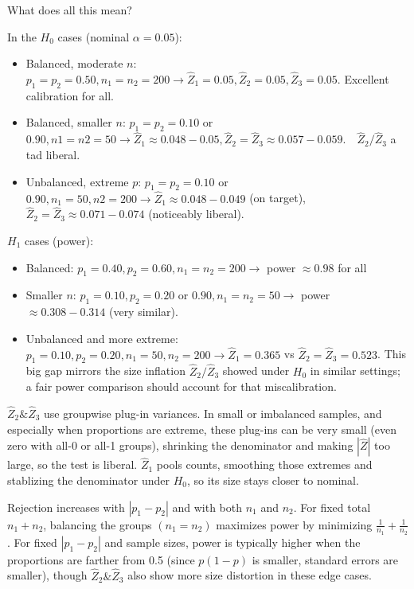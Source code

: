 \documentclass[10pt]{article}
\begin{document}
\begin{enumerate}[label=(\roman*)]
    What does all this mean?

    In the $H_0 $ cases (nominal $\alpha = 0.05 $):
    \begin{itemize}
        \item Balanced, moderate $n$: $p_1 = p_2 = 0.50, n_1 = n_2 = 200 \to \hat{Z}_1 = 0.05, \hat{Z}_2 = 0.05, \hat{Z}_3 = 0.05$. Excellent calibration for all. 
        \item Balanced, smaller $n$: $p_1 = p_2 = 0.10 $ or $0.90, n1 = n2 = 50 \to \hat{Z}_1 \approx 0.048 - 0.05, \hat{Z}_2 = \hat{Z}_3 \approx 0.057 - 0.059.\quad \hat{Z}_2 / \hat{Z}_3$ a tad liberal.
        \item Unbalanced, extreme $p $: $p_1 = p_2 = 0.10 $ or $0.90, n_1 = 50, n2 = 200 \to \hat{Z}_1 \approx 0.048 - 0.049 $ (on target), $\hat{Z}_2 = \hat{Z}_3 \approx 0.071 - 0.074 $ (noticeably liberal).
    \end{itemize}


    $H_1 $ cases (power):
    \begin{itemize}
        \item Balanced: $p_1 = 0.40, p_2 = 0.60, n_1 = n_2 = 200 \to $ power $\approx 0.98 $ for all
        \item Smaller $n $: $p_1 = 0.10, p_2 = 0.20 $ or $0.90, n_1 = n_2 = 50 \to $ power $\approx 0.308 - 0.314 $ (very similar).
        \item Unbalanced and more extreme: $p_1 = 0.10, p_2 = 0.20, n_1 = 50, n_2 = 200 \to \hat{Z}_1 = 0.365 $ vs $\hat{Z}_2 = \hat{Z}_3 = 0.523 $. This big gap mirrors the size inflation $\hat{Z}_2 / \hat{Z}_3 $ showed under $H_0 $ in similar settings; a fair power comparison should account for that miscalibration. 
    \end{itemize}

    $\hat{Z}_2 \& \hat{Z}_3$ use groupwise plug-in variances. In small or imbalanced samples, and especially when proportions are extreme, these plug-ins can be very small (even zero with all-0 or all-1 groups), shrinking the denominator and making $|\hat{Z}|$ too large, so the test is liberal. $\hat{Z}_1 $ pools counts, smoothing those extremes and stablizing the denominator under $H_0 $, so its size stays closer to nominal.

    Rejection increases with $|p_1 - p_2|$ and with both $n_1 $ and $n_2 $. For fixed total $n_1 + n_2 $, balancing the groups $(n_1 = n_2)$ maximizes power by minimizing $\frac{1}{n_1} + \frac{1}{n_2}$. For fixed $|p_1 - p_2|$ and sample sizes, power is typically higher when the proportions are farther from 0.5 (since $p(1 - p)$ is smaller, standard errors are smaller), though $\hat{Z}_2 \& \hat{Z}_3$ also show more size distortion in these edge cases.


\end{enumerate}

\newpage


\newpage

\printbibliography
\end{document}
